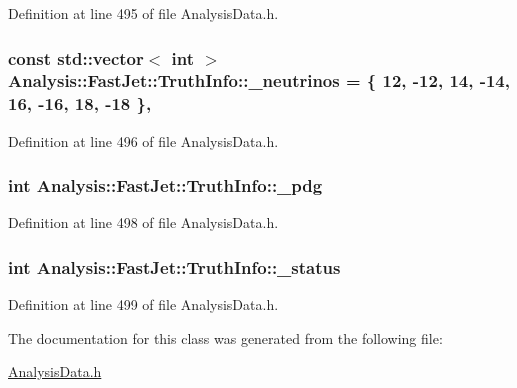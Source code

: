 Definition at line 495 of file Analysis\+Data.\+h.

\subsubsection[{\texorpdfstring{\+\_\+neutrinos}{_neutrinos}}]{\setlength{\rightskip}{0pt plus 5cm}const std\+::vector$<$ int $>$ Analysis\+::\+Fast\+Jet\+::\+Truth\+Info\+::\+\_\+neutrinos = \{ 12, -\/12, 14, -\/14, 16, -\/16, 18, -\/18 \}\hspace{0.3cm}{\ttfamily [static]}, {\ttfamily [private]}}\hypertarget{classAnalysis_1_1FastJet_1_1TruthInfo_a79f2101d71790e8f4a9bbb42843b3c26}{}\label{classAnalysis_1_1FastJet_1_1TruthInfo_a79f2101d71790e8f4a9bbb42843b3c26}


Definition at line 496 of file Analysis\+Data.\+h.

\subsubsection[{\texorpdfstring{\+\_\+pdg}{_pdg}}]{\setlength{\rightskip}{0pt plus 5cm}int Analysis\+::\+Fast\+Jet\+::\+Truth\+Info\+::\+\_\+pdg\hspace{0.3cm}{\ttfamily [protected]}}\hypertarget{classAnalysis_1_1FastJet_1_1TruthInfo_a667df4369792991c7882f89bc120e3e1}{}\label{classAnalysis_1_1FastJet_1_1TruthInfo_a667df4369792991c7882f89bc120e3e1}


Definition at line 498 of file Analysis\+Data.\+h.

\subsubsection[{\texorpdfstring{\+\_\+status}{_status}}]{\setlength{\rightskip}{0pt plus 5cm}int Analysis\+::\+Fast\+Jet\+::\+Truth\+Info\+::\+\_\+status\hspace{0.3cm}{\ttfamily [protected]}}\hypertarget{classAnalysis_1_1FastJet_1_1TruthInfo_a9da9ba4c65c112317584823af4de0bd7}{}\label{classAnalysis_1_1FastJet_1_1TruthInfo_a9da9ba4c65c112317584823af4de0bd7}


Definition at line 499 of file Analysis\+Data.\+h.



The documentation for this class was generated from the following file\+:\begin{DoxyCompactItemize}
\item 
\hyperlink{AnalysisData_8h}{Analysis\+Data.\+h}\end{DoxyCompactItemize}
